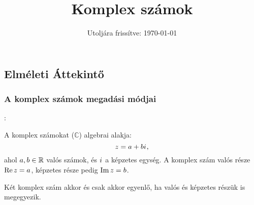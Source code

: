 \documentclass[a4paper, 12pt]{scrartcl}
\title{Komplex számok}
\date{Utoljára frissítve: \today}
\begin{document}
\maketitle

\subsection{Elméleti Áttekintő}

\subsubsection{A komplex számok megadási módjai}

\begin{blueBox}
  :

  \begin{minipage}{.6\textwidth}
    A komplex számokat ($\mathbb C$) algebrai alakja:
    \[
      z = a + b{i\mkern1mu}
      \text,
    \]
    ahol $a, b \in \mathbb{R}$ valós számok, és ${i\mkern1mu}$ a képzetes egység.
    A komplex szám valós része $\operatorname{Re} z = a$, képzetes része pedig $\operatorname{Im} z = b$.
  \end{minipage}\begin{minipage}{.4\textwidth}
    \flushright
  \end{minipage}
\end{blueBox}

\begin{note}
  Két komplex szám akkor és csak akkor egyenlő, ha valós és képzetes részük is
  megegyezik.
\end{note}
\end{document}
